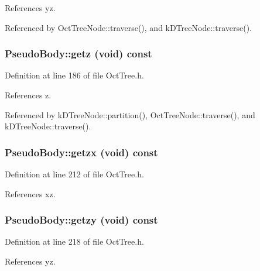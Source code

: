 References yz.



Referenced by OctTreeNode::traverse(), and kDTreeNode::traverse().

\subsubsection[{getz}]{ PseudoBody::getz (void) const}\label{classPseudoBody_aa6f0b3f36e44110c323ef5d0e5e86bbe}


Definition at line 186 of file OctTree.h.



References z.



Referenced by kDTreeNode::partition(), OctTreeNode::traverse(), and kDTreeNode::traverse().

\subsubsection[{getzx}]{ PseudoBody::getzx (void) const}\label{classPseudoBody_ae3cd30378ed74ee2b458262afcea9c0e}


Definition at line 212 of file OctTree.h.



References xz.

\subsubsection[{getzy}]{ PseudoBody::getzy (void) const}\label{classPseudoBody_a8f4d6036427b8c2df7d8e144bb0cfc6e}


Definition at line 218 of file OctTree.h.



References yz.

